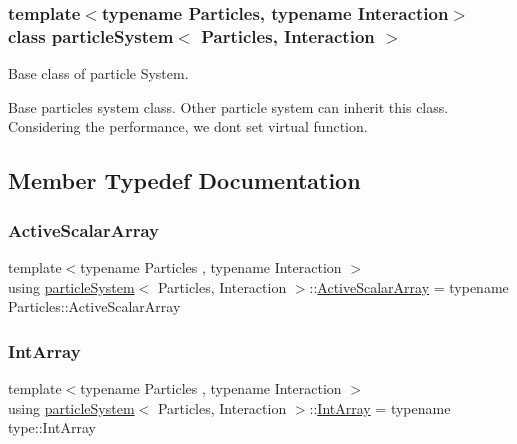 \subsubsection*{template$<$typename Particles, typename Interaction$>$\newline
class particle\+System$<$ Particles, Interaction $>$}

Base class of particle System. 

Base particles system class. Other particle system can inherit this class. Considering the performance, we don\textquotesingle{}t set virtual function. 

\subsection{Member Typedef Documentation}
\mbox{\label{classparticle_system_adeaa416917733980026d138dfde2f7ab}} 
\subsubsection{\texorpdfstring{Active\+Scalar\+Array}{ActiveScalarArray}}
{\footnotesize\ttfamily template$<$typename Particles , typename Interaction $>$ \\
using \mbox{\hyperlink{classparticle_system}{particle\+System}}$<$ Particles, Interaction $>$\+::\mbox{\hyperlink{classparticle_system_adeaa416917733980026d138dfde2f7ab}{Active\+Scalar\+Array}} =  typename Particles\+::\+Active\+Scalar\+Array}

\mbox{\label{classparticle_system_aea9c70dc1a9d1947b425f5383fb21e24}} 
\subsubsection{\texorpdfstring{Int\+Array}{IntArray}}
{\footnotesize\ttfamily template$<$typename Particles , typename Interaction $>$ \\
using \mbox{\hyperlink{classparticle_system}{particle\+System}}$<$ Particles, Interaction $>$\+::\mbox{\hyperlink{classparticle_system_aea9c70dc1a9d1947b425f5383fb21e24}{Int\+Array}} =  typename type\+::\+Int\+Array}

